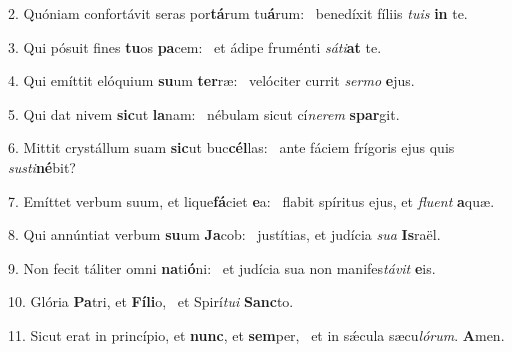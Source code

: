 2. Quóniam confortávit seras por\textbf{tá}rum tu\textbf{á}rum: \ast\  benedíxit fíliis \textit{tu}\textit{is} \textbf{in} te.\

3. Qui pósuit fines \textbf{tu}os \textbf{pa}cem: \ast\  et ádipe fruménti \textit{sá}\textit{ti}\textbf{at} te.\

4. Qui emíttit elóquium \textbf{su}um \textbf{ter}ræ: \ast\  velóciter currit \textit{ser}\textit{mo} \textbf{e}jus.\

5. Qui dat nivem \textbf{sic}ut \textbf{la}nam: \ast\  nébulam sicut cí\textit{ne}\textit{rem} \textbf{spar}git.\

6. Mittit crystállum suam \textbf{sic}ut buc\textbf{cél}las: \ast\  ante fáciem frígoris ejus quis \textit{sus}\textit{ti}\textbf{né}bit?\

7. Emíttet verbum suum, et lique\textbf{fá}ciet \textbf{e}a: \ast\  flabit spíritus ejus, et \textit{flu}\textit{ent} \textbf{a}quæ.\

8. Qui annúntiat verbum \textbf{su}um \textbf{Ja}cob: \ast\  justítias, et judícia \textit{su}\textit{a} \textbf{Is}raël.\

9. Non fecit táliter omni \textbf{na}ti\textbf{ó}ni: \ast\  et judícia sua non manifes\textit{tá}\textit{vit} \textbf{e}is.\

10. Glória \textbf{Pa}tri, et \textbf{Fí}\textbf{li}o, \ast\  et Spirí\textit{tu}\textit{i} \textbf{Sanc}to.\

11. Sicut erat in princípio, et \textbf{nunc}, et \textbf{sem}per, \ast\  et in sǽcula sæcu\textit{ló}\textit{rum}. \textbf{A}men.\

